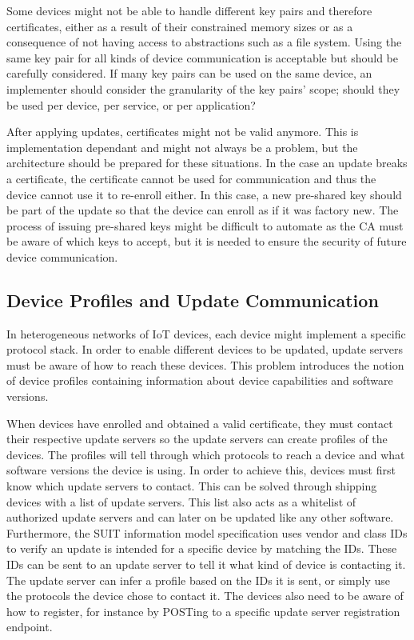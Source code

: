 \documentclass[0-thesis.tex]{subfiles}
\begin{document}
Some devices might not be able to handle different key pairs and therefore certificates,
either as a result of their constrained memory sizes or as a consequence of not having
access to abstractions such as a file system. Using the same key pair for all kinds of
device communication is acceptable but should be carefully considered. If many key pairs
can be used on the same device, an implementer should consider the granularity of the key
pairs' scope; should they be used per device, per service, or per application?

After applying updates, certificates might not be valid anymore. This is implementation
dependant and might not always be a problem, but the architecture should be prepared for
these situations. In the case an update breaks a certificate, the certificate cannot be
used for communication and thus the device cannot use it to re-enroll either. In this
case, a new pre-shared key should be part of the update so that the device can enroll as
if it was factory new. The process of issuing pre-shared keys might be difficult to
automate as the CA must be aware of which keys to accept, but it is needed to ensure the
security of future device communication.

\subsection{Device Profiles and Update Communication}
\label{ssec:communication}
In heterogeneous networks of IoT devices, each device might implement a specific protocol
stack. In order to enable different devices to be updated, update servers must be aware of
how to reach these devices. This problem introduces the notion of device profiles
containing information about device capabilities and software versions. 

When devices have enrolled and obtained a valid certificate, they must contact their
respective update servers so the update servers can create profiles of the devices. The
profiles will tell through which protocols to reach a device and what software versions
the device is using. In order to achieve this, devices must first know which update
servers to contact. This can be solved through shipping devices with a list of update
servers. This list also acts as a whitelist of authorized update servers and can later on
be updated like any other software. Furthermore, the SUIT information model specification
uses vendor and class IDs to verify an update is intended for a specific device by
matching the IDs. These IDs can be sent to an update server to tell it what kind of device
is contacting it. The update server can infer a profile based on the IDs it is sent, or
simply use the protocols the device chose to contact it. The devices also need to be aware
of how to register, for instance by POSTing to a specific update server registration
endpoint. 
\end{document}
